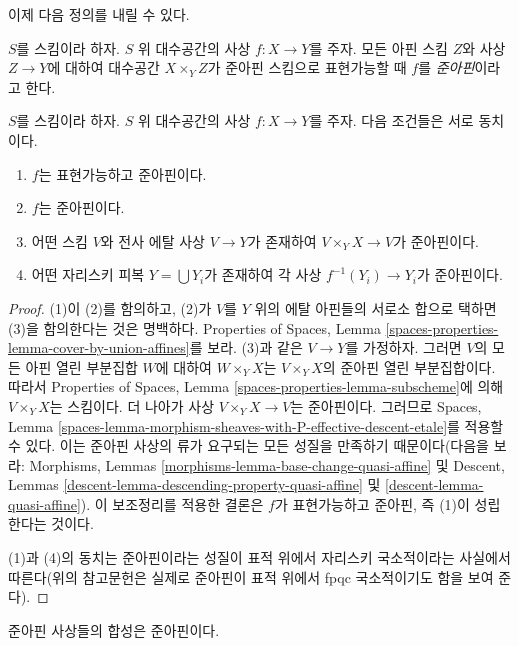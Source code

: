 \noindent
이제 다음 정의를 내릴 수 있다.

\begin{definition}
\label{definition-quasi-affine}
$S$를 스킴이라 하자.
$S$ 위 대수공간의 사상 $f : X \to Y$를 주자.
모든 아핀 스킴 $Z$와 사상 $Z \to Y$에 대하여 대수공간
$X \times_Y Z$가 준아핀 스킴으로 표현가능할 때 $f$를
{\it 준아핀}이라고 한다.
\end{definition}

\begin{lemma}
\label{lemma-quasi-affine-local}
$S$를 스킴이라 하자.
$S$ 위 대수공간의 사상 $f : X \to Y$를 주자.
다음 조건들은 서로 동치이다.
\begin{enumerate}
\item $f$는 표현가능하고 준아핀이다.
\item $f$는 준아핀이다.
\item 어떤 스킴 $V$와 전사 에탈 사상
$V \to Y$가 존재하여 $V \times_Y X \to V$가 준아핀이다.
\item 어떤 자리스키 피복 $Y = \bigcup Y_i$가 존재하여
각 사상 $f^{-1}(Y_i) \to Y_i$가 준아핀이다.
\end{enumerate}
\end{lemma}

\begin{proof}
(1)이 (2)를 함의하고, (2)가
$V$를 $Y$ 위의 에탈 아핀들의 서로소 합으로 택하면 (3)을
함의한다는 것은 명백하다. Properties of Spaces,
Lemma \ref{spaces-properties-lemma-cover-by-union-affines}를 보라.
(3)과 같은 $V \to Y$를 가정하자. 그러면 $V$의 모든 아핀 열린
부분집합 $W$에 대하여 $W \times_Y X$는
$V \times_Y X$의 준아핀 열린 부분집합이다. 따라서
Properties of Spaces, Lemma
\ref{spaces-properties-lemma-subscheme}에 의해
$V \times_Y X$는 스킴이다. 더 나아가 사상
$V \times_Y X \to V$는 준아핀이다. 그러므로
Spaces, Lemma
\ref{spaces-lemma-morphism-sheaves-with-P-effective-descent-etale}를
적용할 수 있다. 이는 준아핀 사상의 류가 요구되는 모든 성질을
만족하기 때문이다(다음을 보라:
Morphisms, Lemmas \ref{morphisms-lemma-base-change-quasi-affine} 및
Descent, Lemmas \ref{descent-lemma-descending-property-quasi-affine}
및 \ref{descent-lemma-quasi-affine}). 이 보조정리를 적용한 결론은
$f$가 표현가능하고 준아핀, 즉 (1)이 성립한다는 것이다.

\medskip\noindent
(1)과 (4)의 동치는 준아핀이라는 성질이 표적 위에서 자리스키
국소적이라는 사실에서 따른다(위의 참고문헌은 실제로 준아핀이
표적 위에서 fpqc 국소적이기도 함을 보여 준다).
\end{proof}

\begin{lemma}
\label{lemma-composition-quasi-affine}
준아핀 사상들의 합성은 준아핀이다.
\end{lemma}

